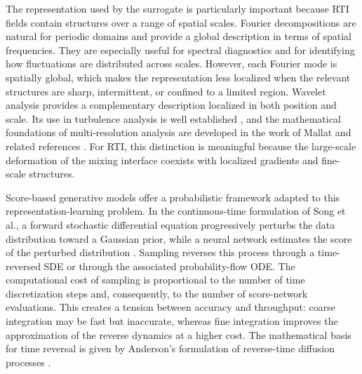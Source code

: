 The representation used by the surrogate is particularly important because RTI fields contain structures over a range of spatial scales. Fourier decompositions are natural for periodic domains and provide a global description in terms of spatial frequencies. They are especially useful for spectral diagnostics and for identifying how fluctuations are distributed across scales. However, each Fourier mode is spatially global, which makes the representation less localized when the relevant structures are sharp, intermittent, or confined to a limited region. Wavelet analysis provides a complementary description localized in both position and scale. Its use in turbulence analysis is well established \citep{Farge1992}, and the mathematical foundations of multi-resolution analysis are developed in the work of Mallat and related references \citep{Mallat2009,Meyer1992}. For RTI, this distinction is meaningful because the large-scale deformation of the mixing interface coexists with localized gradients and fine-scale structures.

Score-based generative models offer a probabilistic framework adapted to this representation-learning problem. In the continuous-time formulation of Song et al., a forward stochastic differential equation progressively perturbs the data distribution toward a Gaussian prior, while a neural network estimates the score of the perturbed distribution \citep{Song2021SDE}. Sampling reverses this process through a time-reversed SDE or through the associated probability-flow ODE. The computational cost of sampling is proportional to the number of time discretization steps and, consequently, to the number of score-network evaluations. This creates a tension between accuracy and throughput: coarse integration may be fast but inaccurate, whereas fine integration improves the approximation of the reverse dynamics at a higher cost. The mathematical basis for time reversal is given by Anderson's formulation of reverse-time diffusion processes \citep{ANDERSON1982313}.

